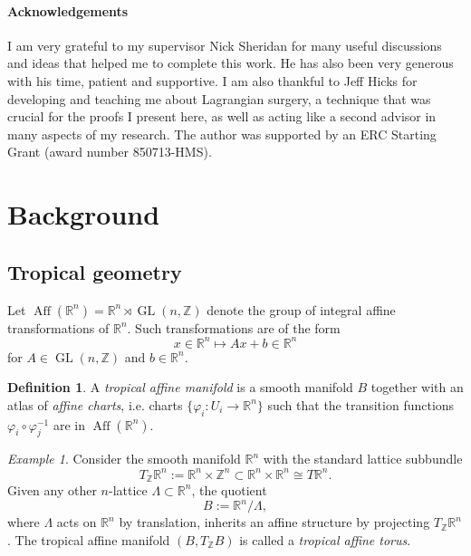 \documentclass[10pt]{amsart}
\theoremstyle{definition}
\newtheorem{defn}[thm]{Definition}
\theoremstyle{remark}
\newtheorem{example}[thm]{Example}
\def\R{\mathbb{R}}
\def\Z{\mathbb{Z}}
\DeclareMathOperator{\Aff}{Aff}
\DeclareMathOperator{\GL}{GL}
\def\inv{^{-1}}
\def\x{\times}
\begin{document}
 

 \paragraph{{\bf Acknowledgements}}
I am very grateful to my supervisor Nick Sheridan for many useful discussions and ideas that helped me to complete this work.
He has also been very generous with his time, patient and supportive.
I am also thankful to Jeff Hicks for developing and teaching me about Lagrangian surgery, a technique that was crucial for the proofs I present here, as well as acting like a second advisor in many aspects of my research.
The author was supported by an ERC Starting Grant (award number 850713-HMS).
 



\section{Background}
\subsection{Tropical geometry}\label{sec:tropicalgeometry}
Let $\Aff(\R^n) = \R^n \rtimes \GL(n,\Z)$ denote the group of integral affine transformations of $\R^n$.
Such transformations are of the form
$$
x \in \R^n \mapsto Ax + b \in \R^n
$$
for $A \in \GL(n,\Z)$ and $b \in \R^n$.
\begin{defn}
    A \emph{tropical affine manifold} is a smooth manifold $B$ together with an atlas of \emph{affine charts}, i.e. charts $\{\varphi_i: U_i \to \R^n\}$ such that the transition functions $\varphi_i\circ\varphi_j\inv$ are in $\Aff(\R^n)$.
\end{defn}
\begin{example}\label{ex:tropicalaffinetorus}
    Consider the smooth manifold $\R^n$ with the standard lattice subbundle 
    $$
    T_\Z\R^n := \R^n \x \Z^n \subset \R^n \x \R^n \cong  T\R^n.
    $$
    Given any other $n$-lattice $\Lambda \subset \R^n$, the quotient
    $$
    B := \R^n / \Lambda,
    $$
    where $\Lambda$ acts on $\R^n$ by translation, inherits an affine structure by projecting $T_\Z \R^n$.
    The tropical affine manifold $(B, T_\Z B)$ is called a \emph{tropical affine torus}.
\end{example}
\end{document}
